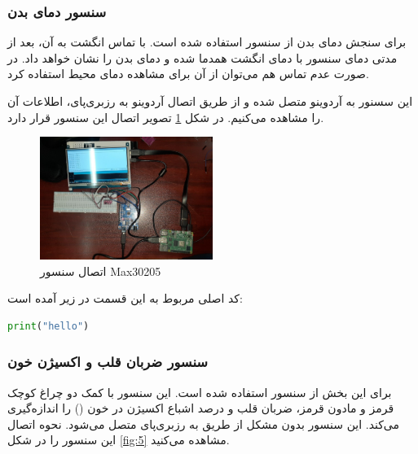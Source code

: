\subsubsection{سنسور دمای بدن}

برای سنجش دمای بدن از سنسور  استفاده شده است. با تماس انگشت به آن، بعد از مدتی دمای سنسور با دمای انگشت همدما شده و دمای بدن را نشان خواهد داد. در صورت عدم تماس هم می‌توان از آن برای مشاهده دمای محیط استفاده کرد.

این سسنور به آردوینو متصل شده و از طریق اتصال آردوینو به رزبری‌پای، اطلاعات آن را مشاهده می‌کنیم. در شکل \ref{fig:4} تصویر اتصال این سنسور قرار دارد.

\begin{figure}[h]
	\centering
	\includegraphics[width=0.5\textwidth]{figs/max30205.jpg}
	
	\caption{اتصال سنسور Max30205}
	\label{fig:4}
\end{figure}
کد اصلی مربوط به این قسمت در زیر آمده است:



\begin{latin}
	\begin{lstlisting}[language=python]
		print("hello")
	\end{lstlisting}
\end{latin}



\subsubsection{سنسور ضربان قلب و اکسیژن خون}

برای این بخش از سنسور  استفاده شده است. این سنسور با کمک دو چراغ کوچک قرمز و مادون قرمز، ضربان قلب و درصد اشباع اکسیژن در خون () را اندازه‌گیری می‌کند. این سنسور بدون مشکل از طریق  به رزبری‌پای متصل می‌شود. نحوه اتصال این سنسور را در شکل \ref{fig:5} مشاهده می‌کنید.

